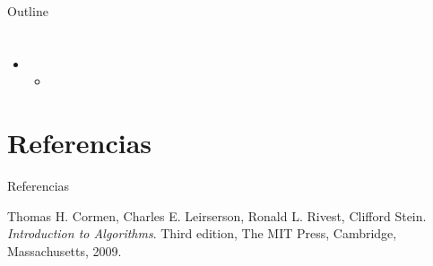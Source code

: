 \documentclass[aspectratio=169]{beamer}
\title{}
\subtitle{}
\date{2015}
\institute{\href{http://www.upc.edu.pe}{Universidad Peruana de Ciencias
Aplicadas}}
\begin{document}
\maketitle

\begin{frame}{Outline}
  \tableofcontents
\end{frame}

\section{}
\subsection{}

\begin{frame}{}
  \begin{itemize}
    \item 
    \begin{itemize}
      \item 
    \end{itemize}
  \end{itemize}
\end{frame}

\section{Referencias}
\begin{frame}{Referencias}
  \begin{thebibliography}{9}
    Thomas H. Cormen, Charles E. Leirserson, Ronald L. Rivest, Clifford Stein.
    \textit{Introduction to Algorithms}. Third edition, The MIT Press, Cambridge, Massachusetts, 2009.
  \end{thebibliography}
\end{frame}
\end{document}

